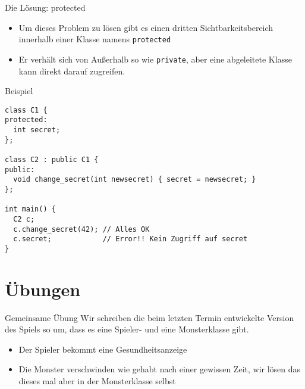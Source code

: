 \documentclass[presentation]{beamer}
\begin{document}
\begin{frame}[label={sec:org3aff9a3},fragile]{Die Lösung: protected}
 \begin{itemize}
\item Um dieses Problem zu lösen gibt es einen dritten
Sichtbarkeitsbereich innerhalb einer Klasse namens {\color{solarizedYellow}\verb!protected!}
\item Er verhält sich von Außerhalb so wie {\color{solarizedYellow}\verb!private!}, aber eine
abgeleitete Klasse kann direkt darauf zugreifen.
\end{itemize}
\begin{exampleblock}{Beispiel}
\begin{verbatim}
class C1 {
protected:
  int secret;
};

class C2 : public C1 {
public:
  void change_secret(int newsecret) { secret = newsecret; }
};

int main() {
  C2 c;
  c.change_secret(42); // Alles OK
  c.secret;            // Error!! Kein Zugriff auf secret
}

\end{verbatim}
\end{exampleblock}
\end{frame}
\section{Übungen}
\label{sec:org0d01232}
\begin{frame}[label={sec:org0d02512}]{Gemeinsame Übung}
Wir schreiben die beim letzten Termin entwickelte Version des Spiels
so um, dass es eine \alert{Spieler- und eine Monsterklasse} gibt.
\begin{itemize}
\item Der Spieler bekommt eine Gesundheitsanzeige
\item Die Monster verschwinden wie gehabt nach einer gewissen Zeit, wir
lösen das dieses mal aber in der Monsterklasse selbst
\end{itemize}
\end{frame}
\end{document}
